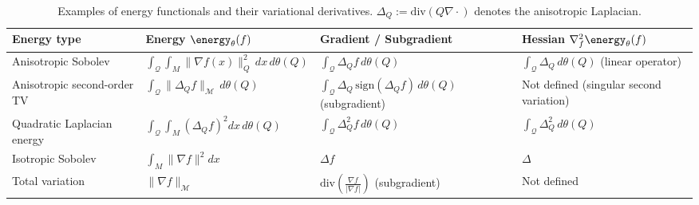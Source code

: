 \begin{table}[h]
	\centering
	\begin{tabular}{p{3.6cm}p{3.6cm}p{4.6cm}p{4.6cm}}
		\toprule
		Energy type                &
		Energy $\energy_\theta(f)$ &
		Gradient / Subgradient     &
		Hessian $\nabla_f^2 \energy_\theta(f)$ \\
		\midrule

		Anisotropic Sobolev
		                           &
		$\displaystyle
			\int_{\mathcal Q}
			\int_M \|\nabla f(x)\|_Q^2 \, dx \, d\theta(Q)
		$
		                           &
		$\displaystyle
			\int_{\mathcal Q} \Delta_Q f \, d\theta(Q)
		$
		                           &
		$\displaystyle
			\int_{\mathcal Q} \Delta_Q \, d\theta(Q)
		$
		(linear operator)
		\\

		Anisotropic second-order TV
		                           &
		$\displaystyle
			\int_{\mathcal Q}
			\|\Delta_Q f\|_{\mathcal M}
			\, d\theta(Q)
		$
		                           &
		$\displaystyle
			\int_{\mathcal Q}
			\Delta_Q \, \mathrm{sign}(\Delta_Q f)
			\, d\theta(Q)
		$
		(subgradient)
		                           &
		Not defined
		(singular second variation)
		\\

		Quadratic Laplacian energy
		                           &
		$\displaystyle
			\int_{\mathcal Q}
			\int_M (\Delta_Q f)^2 dx
			\, d\theta(Q)
		$
		                           &
		$\displaystyle
			\int_{\mathcal Q}
			\Delta_Q^2 f
			\, d\theta(Q)
		$
		                           &
		$\displaystyle
			\int_{\mathcal Q}
			\Delta_Q^2
			\, d\theta(Q)
		$
		\\

		Isotropic Sobolev
		                           &
		$\displaystyle
			\int_M \|\nabla f\|^2 dx
		$
		                           &
		$\Delta f$
		                           &
		$\Delta$
		\\

		Total variation
		                           &
		$\displaystyle
			\|\nabla f\|_{\mathcal M}
		$
		                           &
		$\mathrm{div}\!\left(\frac{\nabla f}{|\nabla f|}\right)$
		(subgradient)
		                           &
		Not defined
		\\

		\bottomrule
	\end{tabular}
	\caption{Examples of energy functionals and their variational derivatives. $\Delta_Q := \mathrm{div}(Q\nabla \cdot)$ denotes the anisotropic Laplacian.}
\end{table}